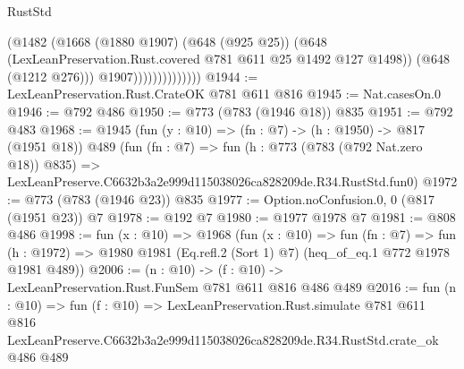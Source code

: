 \begin{lexlean}{RustStd}
\begin{coremodule}
                              (@1482
                                (@1668
                                  (@1880 @1907)
                                  (@648 (@925 @25))
                                  (@648
                                    (LexLeanPreservation.Rust.covered
                                      @781
                                      @611
                                      @25
                                      @1492
                                      @127
                                      @1498))
                                  (@648 (@1212 @276)))
                                @1907))))))))))))))
@1944 := LexLeanPreservation.Rust.CrateOK @781 @611 @816
@1945 := Nat.casesOn.{0}
@1946 := @792 @486
@1950 := @773 (@783 (@1946 @18)) @835
@1951 := @792 @483
@1968 := @1945
    (fun (y : @10) => (fn : @7) -> (h : @1950) -> @817 (@1951 @18))
    @489
    (fun (fn : @7) =>
    fun (h : @773 (@783 (@792 Nat.zero @18)) @835) =>
    LexLeanPreserve.C6632b3a2e999d115038026ca828209de.R34.RustStd.fun0)
@1972 := @773 (@783 (@1946 @23)) @835
@1977 := Option.noConfusion.{0, 0} (@817 (@1951 @23)) @7
@1978 := @192 @7
@1980 := @1977 @1978 @7
@1981 := @808 @486
@1998 := fun (x : @10) =>
  @1968
    (fun (x : @10) =>
    fun (fn : @7) =>
    fun (h : @1972) => @1980 @1981 (Eq.refl.{2} (Sort 1) @7) (heq_of_eq.{1} @772 @1978 @1981 @489))
@2006 := (n : @10) -> (f : @10) -> LexLeanPreservation.Rust.FunSem @781 @611 @816 @486 @489
@2016 := fun (n : @10) =>
  fun (f : @10) =>
  LexLeanPreservation.Rust.simulate
    @781
    @611
    @816
    LexLeanPreserve.C6632b3a2e999d115038026ca828209de.R34.RustStd.crate_ok
    @486
    @489
\end{coremodule}
\end{lexlean}
